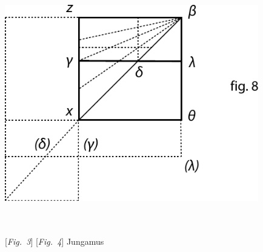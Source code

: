 \hspace{0mm}
\begin{minipage}[t]{0.5\textwidth}
\includegraphics[width=0.83\textwidth]{gesamttex/edit_VIII,3/images/LH_35_09_23_003,006_d4.pdf}
\end{minipage}
\\
\\
\hspace*{25mm} [\textit{Fig.~3}]\hspace*{60mm} [\textit{Fig.~4}]\label{LH_35_09_23_003,006_Fig.3}\label{LH_35_09_23_003,006_Fig.4}%
\pend
\vspace{1.5em}
\pstart%
Jungamus%
